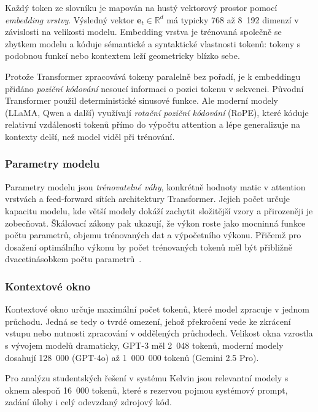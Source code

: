 Každý token ze slovníku je mapován na hustý vektorový prostor pomocí \textit{embedding vrstvy}.
Výsledný vektor $\mathbf{e}_t \in \mathbb{R}^d$ má typicky 768 až 8~192 dimenzí v závislosti na velikosti modelu.
Embedding vrstva je trénovaná společně se zbytkem modelu a kóduje sémantické a syntaktické vlastnosti tokenů: tokeny s podobnou funkcí nebo kontextem leží geometricky blízko sebe.

Protože Transformer zpracovává tokeny paralelně bez pořadí, je k embeddingu přidáno \textit{poziční kódování} nesoucí informaci o pozici tokenu v sekvenci.
Původní Transformer použil deterministické sinusové funkce.
Ale moderní modely (LLaMA, Qwen a další) využívají \textit{rotační poziční kódování} (RoPE), které kóduje relativní vzdálenosti tokenů přímo do výpočtu attention a lépe generalizuje na kontexty delší, než model viděl při trénování.

\subsubsection*{Parametry modelu}
\label{subsubsec:model-parameters}

Parametry modelu jsou \textit{trénovatelné váhy}, konkrétně hodnoty matic v attention vrstvách a feed-forward sítích architektury Transformer.
Jejich počet určuje kapacitu modelu, kde větší modely dokáží zachytit složitější vzory a přirozeněji je zobecňovat.
Škálovací zákony pak ukazují, že výkon roste jako mocninná funkce počtu parametrů, objemu trénovaných dat a výpočetního výkonu.
Přičemž pro dosažení optimálního výkonu by počet trénovaných tokenů měl být přibližně dvacetinásobkem počtu parametrů~\cite{hoffmann-chinchilla}.

\subsubsection*{Kontextové okno}
\label{subsubsec:context-window}

Kontextové okno určuje maximální počet tokenů, které model zpracuje v jednom průchodu.
Jedná se tedy o tvrdé omezení, jehož překročení vede ke zkrácení vstupu nebo nutnosti zpracování v oddělených průchodech.
Velikost okna vzrostla s vývojem modelů dramaticky, GPT-3 měl 2~048 tokenů, moderní modely dosahují 128~000 (GPT-4o) až 1~000~000 tokenů (Gemini 2.5 Pro).

Pro analýzu studentských řešení v systému Kelvin jsou relevantní modely s oknem alespoň 16~000 tokenů, které s rezervou pojmou systémový prompt, zadání úlohy i celý odevzdaný zdrojový kód.

\endinput